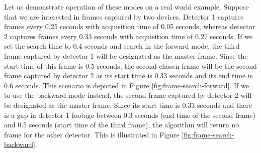 Let us demonstrate operation of these modes on a real world example. Suppose that we are interested in frames captured by two devices. Detector 1 captures frames every 0.25 seconds with acquisition time of 0.05 seconds, whereas detector 2 captures frames every 0.33 seconds with acquisition time of 0.27 seconds. If we set the search time to 0.4 seconds and search in the forward mode, the third frame captured by detector 1 will be designated as the master frame. Since the start time of this frame is 0.5 seconds, the second chosen frame will be the second frame captured by detector 2 as its start time is 0.33 seconds and its end time is 0.6 seconds. This scenario is depicted in Figure \ref{fig:frame-search-forward}. If we to use the backward mode instead, the second frame captured by detector 2 will be designated as the master frame. Since its start time is 0.33 seconds and there is a gap in detector 1 footage between 0.3 seconds (end time of the second frame) and 0.5 seconds (start time of the third frame), the algorithm will return no frame for the other detector. This is illustrated in Figure \ref{fig:frame-search-backward}.


